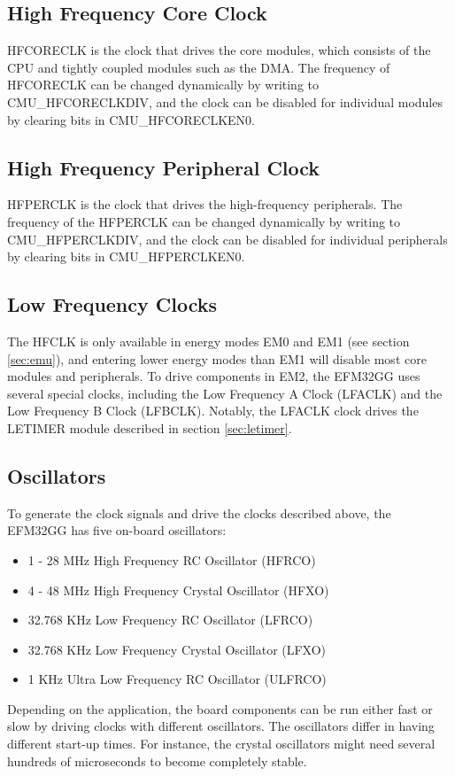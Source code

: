 \subsection{High Frequency Core Clock}
HFCORECLK is the clock that drives the core modules, which consists of the CPU and tightly coupled modules such as the DMA. The frequency of HFCORECLK can be changed dynamically by writing to CMU\_HFCORECLKDIV, and the clock can be disabled for individual modules by clearing bits in CMU\_HFCORECLKEN0. 

\subsection{High Frequency Peripheral Clock}
HFPERCLK is the clock that drives the high-frequency peripherals. The frequency of the HFPERCLK can be changed dynamically by writing to CMU\_HFPERCLKDIV, and the clock can be disabled for individual peripherals by clearing bits in CMU\_HFPERCLKEN0. 

\subsection{Low Frequency Clocks}
The HFCLK is only available in energy modes EM0 and EM1 (see section \ref{sec:emu}), and entering lower energy modes than EM1 will disable most core modules and peripherals. To drive components in EM2, the EFM32GG uses several special clocks, including the Low Frequency A Clock (LFACLK) and the Low Frequency B Clock (LFBCLK). Notably, the LFACLK clock drives the LETIMER module described in section \ref{sec:letimer}.

\subsection{Oscillators}
To generate the clock signals and drive the clocks described above, the EFM32GG has five on-board oscillators:
\begin{itemize}
  \item 1 - 28 MHz High Frequency RC Oscillator (HFRCO)
  \item 4 - 48 MHz High Frequency Crystal Oscillator (HFXO)
  \item 32.768 KHz Low Frequency RC Oscillator (LFRCO)
  \item 32.768 KHz Low Frequency Crystal Oscillator (LFXO)
  \item 1 KHz Ultra Low Frequency RC Oscillator (ULFRCO)
\end{itemize}
Depending on the application, the board components can be run either fast or slow by driving clocks with different oscillators. The oscillators differ in having different start-up times. For instance, the crystal oscillators might need several hundreds of microseconds to become completely stable.\cite{efm32-clock-management-unit-application-note}


